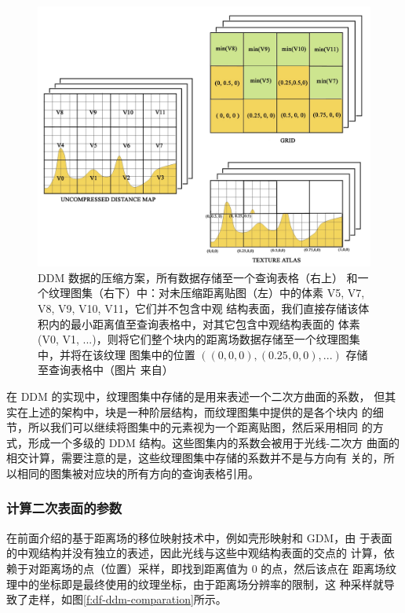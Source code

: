 \begin{figure}
	\includegraphics[width=\textwidth]{figures/df/ddm-compression}
	\caption{DDM 数据的压缩方案，所有数据存储至一个查询表格（右上） 和一个纹理图集（右下）中：对未压缩距离贴图（左）中的体素 V5, V7, V8, V9, V10, V11，它们并不包含中观 结构表面，我们直接存储该体积内的最小距离值至查询表格中，对其它包含中观结构表面的 体素 (V0, V1, ...)，则将它们整个块内的距离场数据存储至一个纹理图集中，并将在该纹理 图集中的位置 $((0,0,0),(0.25,0,0),...)$ 存储至查询表格中（图片 来自\cite{a:directional-distance-maps}）}
	\label{f:df-ddm-compression}
\end{figure}

在 DDM 的实现中，纹理图集中存储的是用来表述一个二次方曲面的系数， 但其实在上述的架构中，块是一种阶层结构，而纹理图集中提供的是各个块内 的细节，所以我们可以继续将图集中的元素视为一个距离贴图，然后采用相同 的方式，形成一个多级的 DDM 结构。这些图集内的系数会被用于光线-二次方 曲面的相交计算，需要注意的是，这些纹理图集中存储的系数并不是与方向有 关的，所以相同的图集被对应块的所有方向的查询表格引用。



\subsubsection{计算二次表面的参数}
在前面介绍的基于距离场的移位映射技术中，例如壳形映射和 GDM，由 于表面的中观结构并没有独立的表述，因此光线与这些中观结构表面的交点的 计算，依赖于对距离场的点（位置）采样，即找到距离值为 0 的点，然后该点在 距离场纹理中的坐标即是最终使用的纹理坐标，由于距离场分辨率的限制，这 种采样就导致了走样，如图\ref{f:df-ddm-comparation}所示。


